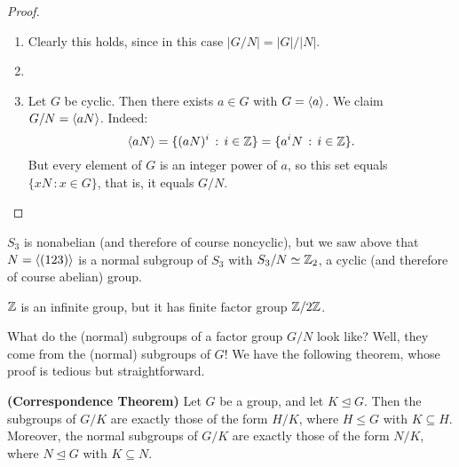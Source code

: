 \begin{proof}\

\begin{enumerate}
\item
Clearly this holds, since in this case
$|G/N|=|G|/|N|$.

\item {}

\item Let $G$ be cyclic.  Then there exists $a\in G$ with $G=\langle a\rangle$.  We claim $G/N=\langle aN\rangle$. Indeed:
$$\langle aN\rangle=\{(aN)^i\,:\,i\in \mathbb{Z}\}=\{a^iN\,:\,i\in \mathbb{Z}\}.$$ But every element of $G$ is an integer power of $a$, so this set equals $\{xN\,:x\in G\}$, that is, it equals $G/N$. \qedhere

\end{enumerate} \end{proof}


\begin{example}{} $S_3$ is nonabelian (and therefore of course noncyclic), but we
saw above that $N=\langle(123)\rangle$ is a normal subgroup of $S_3$ with
$S_3/N \simeq \mathbb{Z}_2$, a cyclic (and therefore of course abelian)
group. \end{example}

\begin{example}{} $\mathbb{Z}$ is an infinite group, but it has finite factor group
$\mathbb{Z}/2\mathbb{Z}$. \end{example}

What do the (normal) subgroups of a factor group $G/N$ look like?
Well, they come from the (normal) subgroups of $G$!  We have the
following theorem, whose proof is tedious but straightforward.

\begin{thm}\label{}{\textbf{(Correspondence Theorem)}} Let $G$ be a
group, and let $K\unlhd G$.  Then the subgroups of $G/K$ are exactly
those of the form $H/K$, where $H\leq G$ with $K\subseteq H$.
Moreover, the normal subgroups of $G/K$ are exactly those of the
form $N/K$, where $N\unlhd G$ with $K\subseteq N$.\end{thm}


